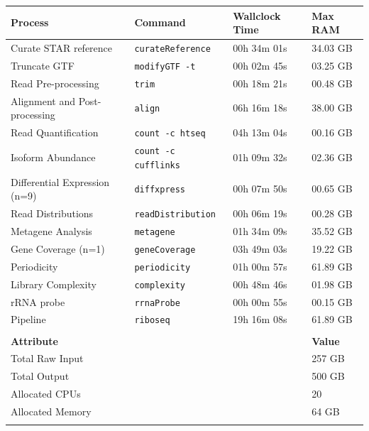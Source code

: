 \documentclass[10pt, oneside]{article}
\begin{document}
\begin{table}[h]
    \centering
{}
\begin{tabular}{p{5cm}p{3.5cm}p{2.7cm}p{1.8cm}}
\textbf{Process} & \textbf{Command} & \textbf{Wallclock Time} & \textbf{Max RAM}\\
  \hline
  Curate STAR reference & \texttt{curateReference} & 00h 34m 01s & 34.03 GB \\
  \hline
  Truncate GTF & \texttt{modifyGTF -t} & 00h 02m 45s & 03.25 GB \\
  \hline
  Read Pre-processing & \texttt{trim} & 00h 18m 21s & 00.48 GB \\
  \hline
  Alignment and Post-processing & \texttt{align} & 06h 16m 18s & 38.00 GB \\
  \hline
  Read Quantification & \texttt{count -c htseq} & 04h 13m 04s & 00.16 GB \\
  \hline
  Isoform Abundance & \texttt{count -c cufflinks} & 01h 09m 32s & 02.36 GB \\
  \hline
  Differential Expression (n=9) & \texttt{diffxpress} & 00h 07m 50s & 00.65 GB \\
  \hline
  Read Distributions & \texttt{readDistribution} & 00h 06m 19s & 00.28 GB \\
  \hline
  Metagene Analysis & \texttt{metagene} & 01h 34m 09s & 35.52 GB \\
  \hline
  Gene Coverage (n=1) & \texttt{geneCoverage} & 03h 49m 03s & 19.22 GB \\
  \hline
  Periodicity & \texttt{periodicity} & 01h 00m 57s & 61.89 GB \\
  \hline
  Library Complexity & \texttt{complexity} & 00h 48m 46s & 01.98 GB \\
  \hline
  rRNA probe & \texttt{rrnaProbe} & 00h 00m 55s & 00.15 GB \\
  \hline
  Pipeline & \texttt{riboseq} & 19h 16m 08s & 61.89 GB \\
  \hline
  & & & \\
  \hline
  \hline
  \textbf{Attribute} & & & \textbf{Value}\\
  \hline
  Total Raw Input & & & 257 GB \\
  \hline
  Total Output & & & 500 GB \\
  \hline
  Allocated CPUs & & & 20 \\
  \hline
  Allocated Memory & & & 64 GB \\
 \label{tab:chpc_performance}
\end{tabular}
\end{table}
\end{document}
